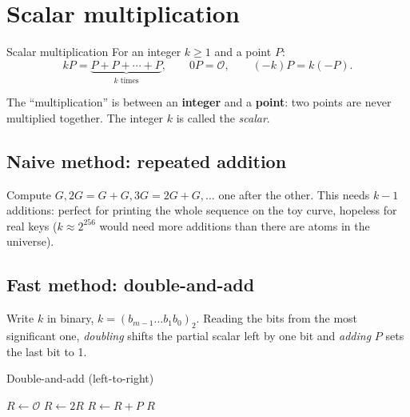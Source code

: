 
\section{Scalar multiplication}

\begin{frameddefn}[label={def:scalarmul}]{Scalar multiplication}
  For an integer $k \ge 1$ and a point $P$:
  \[
    kP = \underbrace{P + P + \cdots + P}_{k \text{ times}}, \qquad 0P = \mathcal{O}, \qquad (-k)P = k(-P).
  \]
\end{frameddefn}

The ``multiplication'' is between an \textbf{integer} and a \textbf{point}: two points are never multiplied together. The integer $k$ is called the \textit{scalar}.

\subsection{Naive method: repeated addition}

Compute $G, 2G = G + G, 3G = 2G + G, \ldots$ one after the other. This needs $k-1$ additions: perfect for printing the whole sequence on the toy curve, hopeless for real keys ($k \approx 2^{256}$ would need more additions than there are atoms in the universe).

\subsection{Fast method: double-and-add}

Write $k$ in binary, $k = (b_{m-1} \ldots b_1 b_0)_2$. Reading the bits from the most significant one, \textit{doubling} shifts the partial scalar left by one bit and \textit{adding} $P$ sets the last bit to 1.

\begin{framedalgo}[label={alg:dbladd}]{Double-and-add (left-to-right)}
  \begin{algorithmic}[1]
      \State $R \gets \mathcal{O}$
        \State $R \gets 2R$ 
          \State $R \gets R + P$ 
        \EndIf
      \EndFor
      \State \Return $R$
    \EndFunction
  \end{algorithmic}
\end{framedalgo}

